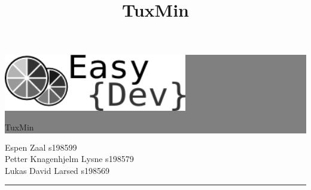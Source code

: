 \setlength{\oddsidemargin}{0mm} %
\setlength{\evensidemargin}{0mm} %

\newcommand{\HRule}[1]{\hfill \rule{0.2\linewidth}{#1}} %



\thispagestyle{empty} %


\colorbox{grey}{
	\parbox[t]{1.0\linewidth}{
		\centering \fontsize{50pt}{80pt}\selectfont %
		\vspace*{0.7cm} %
		
		\hfill 
		\includegraphics[width=80mm]{./img/fremside/logo.png} \\
		\hfill 
		\fontsize{30pt}{50pt}\selectfont 
		{\selectfont 
		TuxMin
		\title{TuxMin}
		}
		\par
		
		\vspace*{0.7cm} %
	}
}


\vfill %


{\centering \large 
\hfill Espen Zaal s198599 \\
\hfill Petter Knagenhjelm Lysne s198579 \\
\hfill Lukas David Larsed s198569 \\


\HRule{1pt}} %


\clearpage %